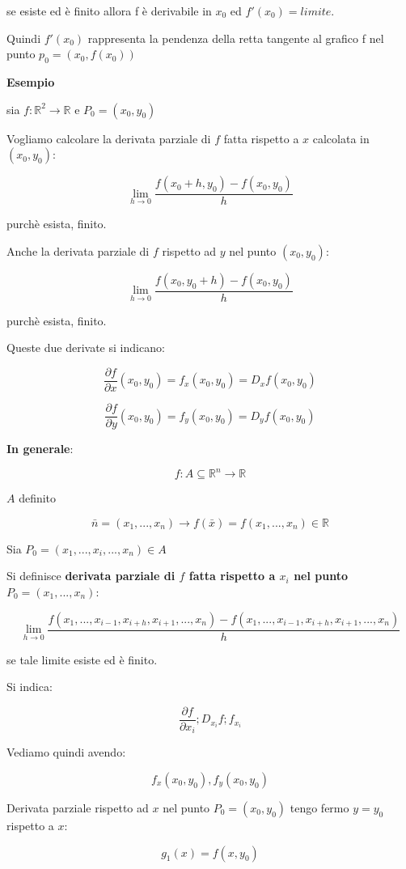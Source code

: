 \documentclass[11pt]{article}
\begin{document}
se esiste ed è finito allora f è derivabile in $x_0$ ed $f'(x_0) = limite$.

Quindi $f'(x_0)$ rappresenta la pendenza della retta tangente al grafico f nel punto $p_0=(x_0,f(x_0))$

\textbf{Esempio} 

sia $f: \mathbb{R}^{2}\rightarrow \mathbb{R}$ e $P_0=(x_0,y_0)$ 

Vogliamo calcolare la derivata parziale di $f$ fatta rispetto a $x$ calcolata in $(x_0,y_0)$:

\[
    \lim_{ h \to 0 } \frac{f(x_0+h,y_0) -f(x_0,y_0)}{h}
\]

purchè esista, finito.

Anche la derivata parziale di $f$ rispetto ad $y$ nel punto $(x_0,y_0)$:

\[
    \lim_{ h \to 0 } \frac{f(x_0,y_0+h) - f(x_0,y_0)}{h}
\]

purchè esista, finito.

Queste due derivate si indicano:

\[
    \frac{\partial f}{\partial x}(x_0,y_0) = f_x(x_0,y_0) = D_xf(x_0,y_0)
\]

\[
    \frac{\partial f}{\partial y}(x_0,y_0) = f_y(x_0,y_0)= D_yf(x_0,y_0)
\]

\textbf{In generale}:

\[
    f: A \subseteq \mathbb{R}^{n} \rightarrow \mathbb{R}
\]

$A$ definito

\[
    \bar{n} = (x_1,...,x_n) \rightarrow f(\bar{x} ) = f(x_1,...,x_n) \in \mathbb{R}
\]

Sia $P_0= (x_1,...,x_i,...,x_n) \in A$

Si definisce \textbf{derivata parziale di $f$ fatta rispetto a $x_i$ nel punto $P_0=(x_1,...,x_n)$}:

\[
    \lim_{ h \to 0 } \frac{f(x_1,...,x_{i-1},x_{i+h},x_{i+1},...,x_n) - f(x_1,...,x_{i-1},x_{i+h},x_{i+1},...,x_n)}{h}
\]

se tale limite esiste ed è finito.

Si indica:

\[
    \frac{\partial f}{\partial x_i}; D_{x_i}f;f_{x_i}
\]

Vediamo quindi avendo:

\[
    f_x(x_0,y_0),f_y(x_0,y_0)
\]

Derivata parziale rispetto ad $x$ nel punto $P_0=(x_0,y_0)$ tengo fermo $y=y_0$ rispetto a $x$:

\[
    g_1(x)= f(x,y_0) 
\]
\end{document}
